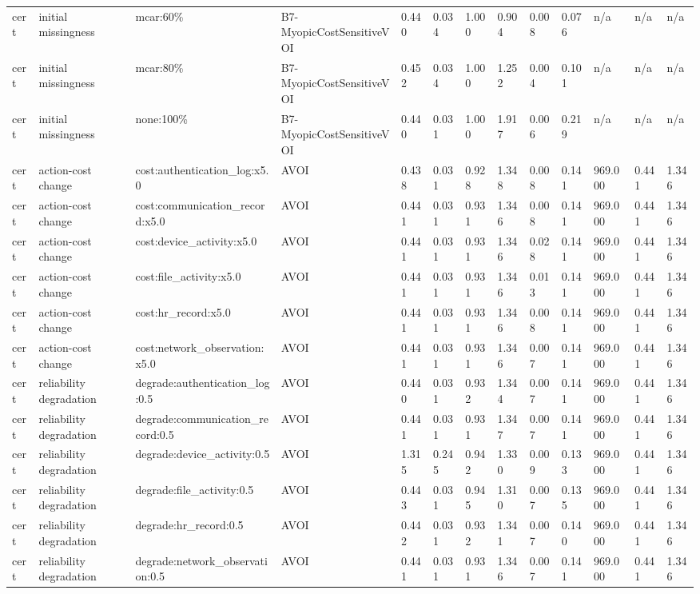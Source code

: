 \begin{table}[!ht]
{\begin{tabular}{lllllllllllll}
cert & initial missingness & mcar:60\% & B7-MyopicCostSensitiveVOI & 0.440 & 0.034 & 1.000 & 0.904 & 0.008 & 0.076 & n/a & n/a & n/a \\
cert & initial missingness & mcar:80\% & B7-MyopicCostSensitiveVOI & 0.452 & 0.034 & 1.000 & 1.252 & 0.004 & 0.101 & n/a & n/a & n/a \\
cert & initial missingness & none:100\% & B7-MyopicCostSensitiveVOI & 0.440 & 0.031 & 1.000 & 1.917 & 0.006 & 0.219 & n/a & n/a & n/a \\
cert & action-cost change & cost:authentication\_log:x5.0 & AVOI & 0.438 & 0.031 & 0.928 & 1.348 & 0.008 & 0.141 & 969.000 & 0.441 & 1.346 \\
cert & action-cost change & cost:communication\_record:x5.0 & AVOI & 0.441 & 0.031 & 0.931 & 1.346 & 0.008 & 0.141 & 969.000 & 0.441 & 1.346 \\
cert & action-cost change & cost:device\_activity:x5.0 & AVOI & 0.441 & 0.031 & 0.931 & 1.346 & 0.028 & 0.141 & 969.000 & 0.441 & 1.346 \\
cert & action-cost change & cost:file\_activity:x5.0 & AVOI & 0.441 & 0.031 & 0.931 & 1.346 & 0.013 & 0.141 & 969.000 & 0.441 & 1.346 \\
cert & action-cost change & cost:hr\_record:x5.0 & AVOI & 0.441 & 0.031 & 0.931 & 1.346 & 0.008 & 0.141 & 969.000 & 0.441 & 1.346 \\
cert & action-cost change & cost:network\_observation:x5.0 & AVOI & 0.441 & 0.031 & 0.931 & 1.346 & 0.007 & 0.141 & 969.000 & 0.441 & 1.346 \\
cert & reliability degradation & degrade:authentication\_log:0.5 & AVOI & 0.440 & 0.031 & 0.932 & 1.344 & 0.007 & 0.141 & 969.000 & 0.441 & 1.346 \\
cert & reliability degradation & degrade:communication\_record:0.5 & AVOI & 0.441 & 0.031 & 0.931 & 1.347 & 0.007 & 0.141 & 969.000 & 0.441 & 1.346 \\
cert & reliability degradation & degrade:device\_activity:0.5 & AVOI & 1.315 & 0.245 & 0.942 & 1.330 & 0.009 & 0.133 & 969.000 & 0.441 & 1.346 \\
cert & reliability degradation & degrade:file\_activity:0.5 & AVOI & 0.443 & 0.031 & 0.945 & 1.310 & 0.007 & 0.135 & 969.000 & 0.441 & 1.346 \\
cert & reliability degradation & degrade:hr\_record:0.5 & AVOI & 0.442 & 0.031 & 0.932 & 1.341 & 0.007 & 0.140 & 969.000 & 0.441 & 1.346 \\
cert & reliability degradation & degrade:network\_observation:0.5 & AVOI & 0.441 & 0.031 & 0.931 & 1.346 & 0.007 & 0.141 & 969.000 & 0.441 & 1.346 \\

\end{tabular}}
\end{table}
